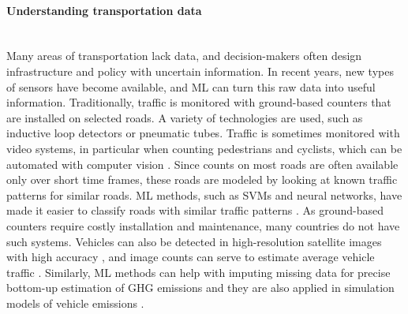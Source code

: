 \documentclass[11pt]{report}
\begin{document}
\paragraph*{Understanding transportation data}\mbox{}\\\label{sec:transport-data}Many areas of transportation lack data, and decision-makers often design infrastructure and policy with uncertain information. In recent years, new types of sensors have become available, and ML can turn this raw data into useful information.
Traditionally, traffic is monitored with ground-based counters that are installed on selected roads. A variety of technologies are used, such as inductive loop detectors or pneumatic tubes. Traffic is sometimes monitored with video systems, in particular when counting pedestrians and cyclists, which can be automated with computer vision \cite{Zaki2016361}.
Since counts on most roads are often available only over short time frames, these roads are modeled by looking at known traffic patterns for similar roads. ML methods, such as SVMs and neural networks, have made it easier to classify roads with similar traffic patterns \cite{krile2016assessing, tsapakis2015use, gastaldi2013annual}. 
As ground-based counters require costly installation and maintenance, many countries do not have such systems. Vehicles can also be detected in high-resolution satellite images with high accuracy \cite{sommer2017fast, jiang2015deep, mundhenk2016large, deng2017toward}, and image counts can serve to estimate average vehicle traffic \cite{kaack2019truck}. 
Similarly, ML methods can help with imputing missing data for precise bottom-up estimation of GHG emissions \cite{NOCERA2018125} and they are also applied in simulation models of vehicle emissions \cite{doi:10.1080/15568318.2017.1346732}. 
\end{document}
